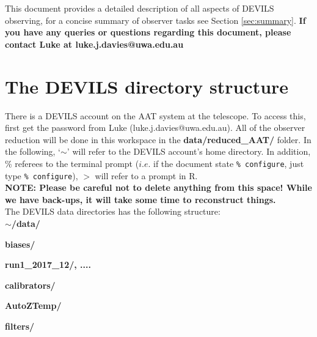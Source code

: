 \documentclass[12pt]{article}
\begin{document}
This document provides a detailed description of all aspects of DEVILS observing, for a concise summary of observer tasks see Section \ref{sec:summary}. \textcolor{PineGreen}{\textbf{If you have any queries or questions regarding this document, please contact Luke at luke.j.davies@uwa.edu.au}}\\

     
\section{The DEVILS directory structure}


There is a DEVILS account on the AAT system at the telescope. To access this, first get the password from Luke (luke.j.davies@uwa.edu.au). All of the observer reduction will be done in this workspace in the \textbf{data/reduced\_AAT/} folder. In the following, `$\sim$' will refer to the DEVILS account's home directory. In addition, \% referees to the terminal prompt ($i.e.$ if the document state \texttt{\% configure}, just type \texttt{\% configure}), $>$ will refer to a prompt in R. \\

\textcolor{PineGreen}{\textbf{NOTE: Please be careful not to delete anything from this space! While we have back-ups, it will take some time to reconstruct things.}}\\

The DEVILS data directories has the following structure:\\

\hspace{5mm} \textbf{$\sim$/data/} 
\vspace{1mm}

\hspace{10mm} \textbf{biases/}
\vspace{1mm}

\hspace{15mm} \textbf{run1\_2017\_12/, ....} 
\vspace{1mm}

\hspace{10mm} \textbf{calibrators/} 
\vspace{1mm}

\hspace{15mm} \textbf{AutoZTemp/} 
\vspace{1mm}

\hspace{15mm} \textbf{filters/} 
\vspace{1mm}
\end{document}

